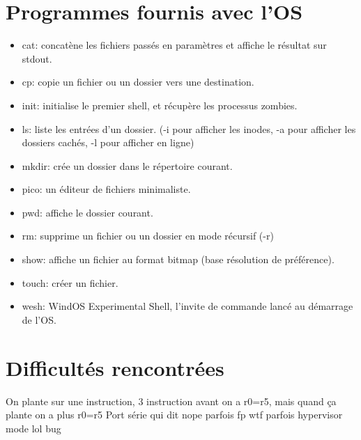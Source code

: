 \documentclass[a4paper]{article}
\begin{document}
\section{Programmes fournis avec l'OS}
\begin{itemize}
	\item cat: concatène les fichiers passés en paramètres et affiche le résultat sur stdout.
	\item cp: copie un fichier ou un dossier vers une destination.
	\item init: initialise le premier shell, et récupère les processus zombies.
	\item ls: liste les entrées d'un dossier. (-i pour afficher les inodes, -a pour afficher les dossiers cachés, -l pour afficher en ligne)
	\item mkdir: crée un dossier dans le répertoire courant.
	\item pico: un éditeur de fichiers minimaliste.
	\item pwd: affiche le dossier courant.
	\item rm: supprime un fichier ou un dossier en mode récursif (-r)
	\item show: affiche un fichier au format bitmap (base résolution de préférence).
	\item touch: créer un fichier.
	\item wesh: WindOS Experimental Shell, l'invite de commande lancé au démarrage de l'OS.
\end{itemize}

\section{Difficultés rencontrées}
On plante sur une instruction, 3 instruction avant on a r0=r5, mais quand ça
plante on a plus r0=r5
Port série qui dit nope parfois
fp wtf parfois
hypervisor mode lol bug
\end{document}
